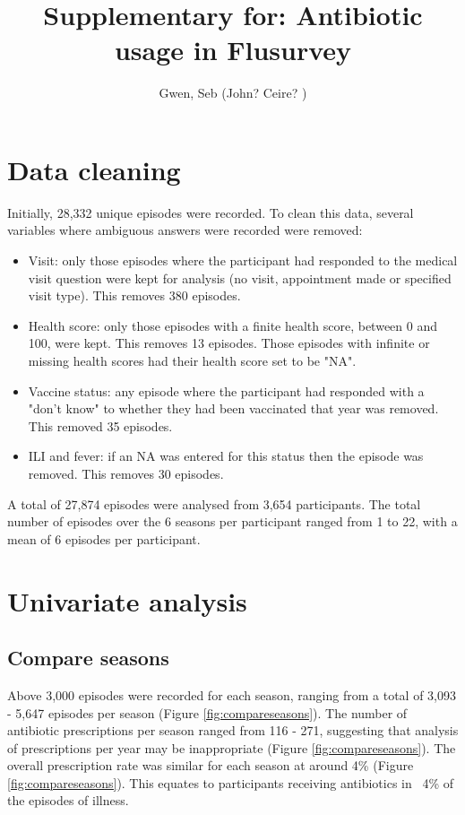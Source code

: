 \documentclass{article}
\title{Supplementary for: Antibiotic usage in Flusurvey}
\author{Gwen, Seb (John? Ceire? )}
\date{}
\begin{document}
	 
	\maketitle{}

	\tableofcontents{}

	\clearpage

	\section{Data cleaning}

	Initially, 28,332 unique episodes were recorded. To clean this data, several variables where ambiguous answers were recorded were removed:

	\begin{itemize}
		\item Visit: only those episodes where the participant had responded to the medical visit question were kept for analysis (no visit, appointment made or specified visit type). This removes 380 episodes. 
		\item Health score: only those episodes with a finite health score, between 0 and 100, were kept. This removes 13 episodes. Those episodes with infinite or missing health scores had their health score set to be "NA". 
		\item Vaccine status: any episode where the participant had responded with a "don't know" to whether they had been vaccinated that year was removed. This removed 35 episodes. 
		\item ILI and fever: if an NA was entered for this status then the episode was removed. This removes 30 episodes. 
	\end{itemize}

	A total of 27,874 episodes were analysed from 3,654 participants. The total number of episodes over the 6 seasons per participant ranged from 1 to 22, with a mean of 6 episodes per participant. 

	\section{Univariate analysis}

\subsection{Compare seasons}

Above 3,000 episodes were recorded for each season, ranging from a total of 3,093 - 5,647 episodes per season (Figure \ref{fig:compareseasons}). The number of antibiotic prescriptions per season ranged from 116 - 271, suggesting that analysis of prescriptions per year may be inappropriate (Figure \ref{fig:compareseasons}). The overall prescription rate was similar for each season at around 4\% (Figure \ref{fig:compareseasons}). This equates to participants receiving antibiotics in ~4\% of the episodes of illness. 
\end{document}
